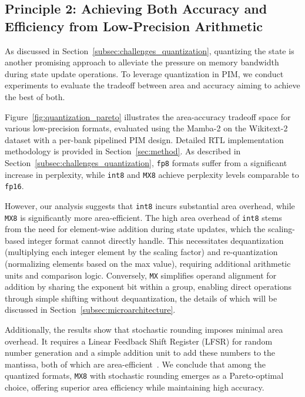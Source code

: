 %

\subsection{Principle 2: Achieving Both Accuracy and Efficiency from
Low-Precision Arithmetic}
\label{subsec:area_accuracy}
%
As discussed in Section~\ref{subsec:challenges_quantization},
quantizing the state is another promising approach to alleviate the
pressure on memory bandwidth during state update operations.
%
To leverage quantization in PIM, we conduct experiments to evaluate
the tradeoff between area and accuracy aiming to achieve the best of both.
%

%
%
Figure~\ref{fig:quantization_pareto} illustrates the area-accuracy
tradeoff space for various low-precision formats, evaluated using the
Mamba-2 on the Wikitext-2~\cite{merity2016pointer} dataset with a
per-bank pipelined PIM design.
%
Detailed RTL implementation methodology is provided in Section~\ref{sec:method}.
%
As described in Section~\ref{subsec:challenges_quantization},
\texttt{fp8} formats suffer from a significant increase in
perplexity, while \texttt{int8} and \texttt{MX8} achieve perplexity
levels comparable to \texttt{fp16}.
%

%
However, our analysis suggests that \texttt{int8} incurs substantial
area overhead, while \texttt{MX8} is significantly more area-efficient.
%
The high area overhead of \texttt{int8} stems from the need for
element-wise addition during state updates, which the scaling-based
integer format cannot directly handle.
%
This necessitates dequantization (multiplying each integer element by
the scaling factor) and re-quantization (normalizing elements based
on the max value), requiring additional arithmetic units and comparison logic.
%
Conversely, \texttt{MX} simplifies operand alignment for addition by
sharing the exponent bit within a group, enabling direct operations
through simple shifting without dequantization, the details of which
will be discussed in Section~\ref{subsec:microarchitecture}.
%

Additionally, the results show that stochastic rounding imposes
minimal area overhead.
%
It requires a Linear Feedback Shift Register (LFSR) for random number
generation and a simple addition unit to add these numbers to the
mantissa, both of which are area-efficient~\cite{9773221}.
%
We conclude that among the quantized formats, \texttt{MX8} with
stochastic rounding emerges as a Pareto-optimal choice, offering
superior area efficiency while maintaining high accuracy.

